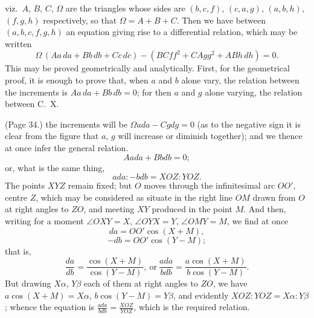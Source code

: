 \documentclass[11pt,a4paper]{article}
\begin{document}
\begin{center}
\end{center}

\noindent viz.\ $A$, $B$, $C$, $\Omega$ are the triangles whose sides are $(b, c, f)$, $(c, a, g)$, $(a, b, h)$, $(f, g, h)$ respectively, so that $\Omega = A + B + C$. Then we have between $(a, b, c, f, g, h)$ an equation giving rise to a differential relation, which may be written
\[
\Omega \, (Aa\,da + Bb\,db + Cc\,dc) - (BCff^2 + CAgg^2 + ABh\,dh) = 0.
\]
This may be proved geometrically and analytically. First, for the geometrical proof, it is enough to prove that, when $a$ and $b$ alone vary, the relation between the increments is $Aa\,da + Bb\,db = 0$; for then $a$ and $g$ alone varying, the relation between
\hfill C.\ X. 

\bigskip

\noindent (Page 34.) the increments will be $\Omega ada - Cgdg = 0$ (as to the negative sign it is clear from the figure that $a$, $g$ will increase or diminish together); and we thence at once infer the general relation.
\[
Aada + Bbdb = 0;
\]
or, what is the same thing,
\[
a da : -bdb = XOZ : YOZ.
\]
The points $XYZ$ remain fixed; but $O$ moves through the infinitesimal arc $OO'$, centre $Z$, which may be considered as situate in the right line $OM$ drawn from $O$ at right angles to $ZO$, and meeting $XY$ produced in the point $M$. And then, writing for a moment $\angle OXY = X$, $\angle OYX = Y$, $\angle OMY = M$, we find at once
\[
da = OO' \cos (X + M),
\]
\[
-db = OO' \cos (Y - M);
\]
that is,
\[
\frac{da}{db} = \frac{\cos (X + M)}{\cos (Y - M)},\ \text{or}\ \frac{ada}{bdb} = \frac{a \cos (X + M)}{b \cos (Y - M)}.
\]
But drawing $X\alpha$, $Y\beta$ each of them at right angles to $ZO$, we have $a \cos (X + M) = X\alpha$, $b \cos (Y - M) = Y\beta$, and evidently $XOZ : YOZ = X\alpha : Y\beta$; whence the equation is $\frac{ada}{bdb} = \frac{XOZ}{YOZ}$, which is the required relation.
\end{document}
